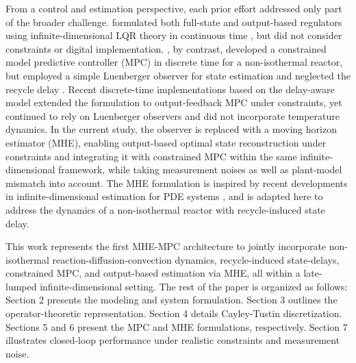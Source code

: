 From a control and estimation perspective, each prior effort addressed only part of the broader challenge.  formulated both full-state and output-based regulators using infinite-dimensional LQR theory in continuous time \autocite{moadeli2025optimal}, but did not consider constraints or digital implementation. , by contrast, developed a constrained model predictive controller (MPC) in discrete time for a non-isothermal reactor, but employed a simple Luenberger observer for state estimation and neglected the recycle delay \autocite{Khatibi2021Model}. Recent discrete-time implementations based on the delay-aware model \autocite{Moadeli2025Model,Moadeli2025Observer} extended the formulation to output-feedback MPC under constraints, yet continued to rely on Luenberger observers and did not incorporate temperature dynamics. In the current study, the observer is replaced with a moving horizon estimator (MHE), enabling output-based optimal state reconstruction under constraints and integrating it with constrained MPC within the same infinite-dimensional framework, while taking measurement noises as well as plant-model mismatch into account. The MHE formulation is inspired by recent developments in infinite-dimensional estimation for PDE systems \autocite{xie2022constrained, zhang2023tracking}, and is adapted here to address the dynamics of a non-isothermal reactor with recycle-induced state delay.

This work represents the first MHE-MPC architecture to jointly incorporate non-isothermal reaction-diffusion-convection dynamics, recycle-induced state-delays, constrained MPC, and output-based estimation via MHE, all within a late-lumped infinite-dimensional setting. The rest of the paper is organized as follows: Section 2 presents the modeling and system formulation. Section 3 outlines the operator-theoretic representation. Section 4 details Cayley-Tustin discretization. Sections 5 and 6 present the MPC and MHE formulations, respectively. Section 7 illustrates closed-loop performance under realistic constraints and measurement noise.

